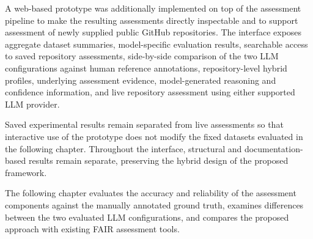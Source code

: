 A web-based prototype was additionally implemented on top of the
assessment pipeline to make the resulting assessments directly
inspectable and to support assessment of newly supplied public GitHub
repositories. The interface exposes aggregate dataset summaries,
model-specific evaluation results, searchable access to saved
repository assessments, side-by-side comparison of the two LLM
configurations against human reference annotations, repository-level
hybrid profiles, underlying assessment evidence, model-generated
reasoning and confidence information, and live repository assessment
using either supported LLM provider.

Saved experimental results remain separated from live assessments so
that interactive use of the prototype does not modify the fixed
datasets evaluated in the following chapter. Throughout the interface,
structural and documentation-based results remain separate, preserving
the hybrid design of the proposed framework.

The following chapter evaluates the accuracy and reliability of the
assessment components against the manually annotated ground truth,
examines differences between the two evaluated LLM configurations, and
compares the proposed approach with existing FAIR assessment tools.